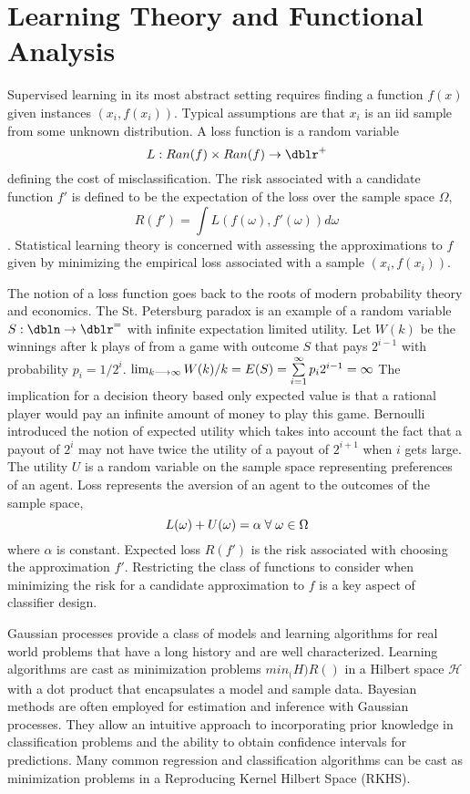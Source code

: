 \section{Learning Theory and Functional Analysis}
Supervised learning in its most abstract setting requires finding a function $f(x)$ given instances ${ (x_i ,f(x_i))}$. Typical assumptions are that ${x_i}$ is an iid sample from some unknown distribution. A loss function is a random variable \[ L : Ran(f) \times Ran(f) \rightarrow \dblr^+\] defining the cost of misclassification.  The risk associated with a candidate function $f'$ is defined to be the expectation of the loss over the sample space $\Omega$, \begin{equation} R(f')=\int L( f(\omega), f'(\omega)) d\omega\end{equation}.  Statistical learning theory is concerned with assessing the approximations to $f$ given by minimizing the empirical loss associated with a sample ${ (x_i ,f(x_i))}$.

The notion of a loss function goes back to the roots of modern probability theory and economics. The St. Petersburg paradox is an example of a random variable $S : \dbln \rightarrow \dblr^=$ with infinite expectation limited utility. Let $W(k)$ be the winnings after k plays of from a game with outcome $S$ that pays $2^{i-1}$ with probability $p_i=1/2^i$. $\lim_{k\longrightarrow\infty} W(k)/k =E(S)=\sum\limits_{i=1}^{\infty} p_i 2^{i-1}= \infty$ The implication for a decision theory based only expected value is that a rational player would pay an infinite amount of money to play this game. Bernoulli introduced the notion of expected utility which takes into account the fact that a payout of $2^i$ may not have twice the utility of a payout of $2^{i+1}$ when $i$ gets large.  The utility $U$ is a random variable on the sample space representing preferences of an agent.  Loss represents the aversion of an agent to the outcomes of the sample space, \[L(\omega)+U(\omega) = \alpha \; \forall \; \omega \in \Omega\] where $\alpha$ is constant.  Expected loss $R(f')$ is the risk associated with choosing the approximation $f'$. Restricting the class of functions to consider when minimizing the risk for a candidate approximation to $f$ is a key aspect of classifier design.

Gaussian processes provide a class of models and learning algorithms for real world problems that have a long history and are well characterized. Learning algorithms are cast as minimization problems $min_\mathcal(H) R() $ in a Hilbert space $ \mathcal{H}$ with a dot product that encapsulates a model and sample data.  Bayesian methods are often employed for estimation and inference with Gaussian processes. They allow an intuitive approach to incorporating prior knowledge in classification problems and the ability to obtain confidence intervals for predictions.  Many common regression and classification algorithms can be cast as minimization problems in a Reproducing Kernel Hilbert Space (RKHS).



